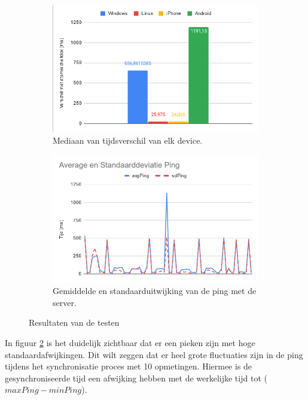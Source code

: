 \begin{figure}[H]
	\centering
	\begin{subfigure}{.5\textwidth}
		\centering
		\includegraphics[width=.95\linewidth]{img/mediaan.png}
		\caption{Mediaan van tijdsverschil van elk device.}
		\label{fig:mediaan}
	\end{subfigure}%
	\begin{subfigure}{.5\textwidth}
		\centering
		\includegraphics[width=.95\linewidth]{img/ping_results.png}
		\caption{Gemiddelde en standaarduitwijking van de ping met de server. }
		\label{fig:avgPing}
	\end{subfigure}
	\caption{Resultaten van de testen}
	\label{fig:results}
\end{figure}

In figuur \ref{fig:avgPing} is het duidelijk zichtbaar dat er een pieken zijn met hoge standaardafwijkingen. Dit wilt zeggen dat er heel grote fluctuaties zijn in de ping tijdens het synchronisatie proces met 10 opmetingen. Hiermee is de gesynchroniseerde tijd een afwijking hebben met de werkelijke tijd tot ($maxPing - minPing$).




















